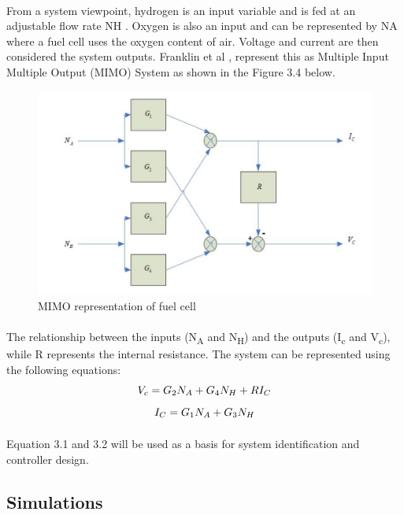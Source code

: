 \paragraph{}From a system viewpoint, hydrogen is an input variable and is fed at an adjustable flow rate NH . Oxygen is also an input and can be represented by NA where a fuel cell uses the oxygen content of air. Voltage and current are then considered the system outputs. Franklin et al \cite{franklin_feedback_2002}, represent this as Multiple Input Multiple Output (MIMO) System as shown in the Figure 3.4 below.
\begin{figure}[!h]
\includegraphics{Figures/mimo}
\caption{MIMO representation of fuel cell \cite{thanapalan_model_2011}}
\end{figure}
\paragraph{}The relationship between the inputs (N\textsubscript{A} and N\textsubscript{H}) and the outputs (I\textsubscript{c} and V\textsubscript{c}), while R represents the internal resistance. The system can be represented using the following equations:
\begin{equation}
$$ V_{c} = G_{2}N_{A} + G_{4}N_{H} + RI_{C} $$
\end{equation}
\begin{equation}
$$ I_{C} = G_{1}N_{A} + G_{3}N_{H} $$
\end{equation}
\paragraph{}Equation 3.1 and 3.2 will be used as a basis for system identification and controller design.
\subsection{Simulations}

